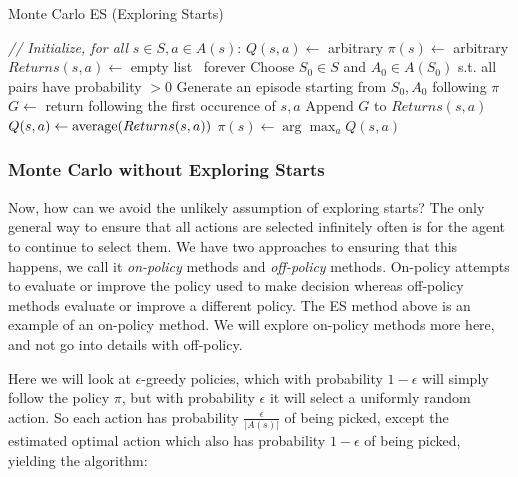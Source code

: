    \begin{algorithm}
        \caption{Monte Carlo ES (Exploring Starts)}
        \begin{algorithmic}
            \State \textit{// Initialize, for all } $s\in S, a\in A(s)$:
            \State $Q(s,a) \gets$ arbitrary
            \State $\pi(s) \gets$ arbitrary
            \State $Returns(s,a) \gets$ empty list
            \State
            \Loop\, forever
                \State Choose $S_0 \in S$ and $A_0 \in A(S_0)$ s.t. all pairs 
                have probability $> 0$
                \State Generate an episode starting from $S_0, A_0$ following 
                $\pi$
                    \State $G \gets$ return following the first occurence of 
                    $s,a$
                    \State Append $G$ to $Returns(s,a)$
                    \State $Q(s,a) \gets \text{average}(Returns(s,a))$
                \EndFor
                    \State $\pi(s) \gets \arg \max_a Q(s,a)$
                \EndFor
            \EndLoop
        \end{algorithmic}
    \end{algorithm}
    
    \subsubsection{Monte Carlo without Exploring Starts}
    Now, how can we avoid the unlikely assumption of exploring starts? The only 
    general way to ensure that all actions are selected infinitely often is for 
    the agent to continue to select them. We have two approaches to ensuring 
    that this happens, we call it \textit{on-policy} methods  and 
    \textit{off-policy} methods. On-policy attempts to evaluate or improve the 
    policy used to make decision whereas off-policy methods evaluate or improve 
    a different policy. The ES method above is an example of an on-policy 
    method. We will explore on-policy methods more here, and not go into 
    details with off-policy.
    
    Here we will look at $\epsilon$-greedy policies, which with probability 
    $1-\epsilon$ will simply follow the policy $\pi$, but with probability 
    $\epsilon$ it will select a uniformly random action. So each action has 
    probability $\frac{\epsilon}{|A(s)|}$ of being picked, except the estimated 
    optimal action which also has probability $1-\epsilon$ of being picked, 
    yielding the algorithm:
    
